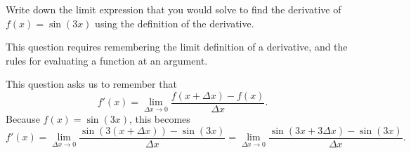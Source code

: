 \documentclass{ximera}
\author{Emma Smith Zbarsky}
\begin{document}
\begin{exercise}

Write down the limit expression that you would solve to find the
derivative of $f(x) = \sin(3x)$ using the definition of the derivative.


\begin{hint}
This question requires remembering the limit definition of a derivative,
and the rules for evaluating a function at an argument.
\end{hint}


\begin{hint}
This question asks us to remember that
\[f'(x) = \lim_{\Delta x \to 0} \frac{f(x+\Delta x)-f(x)}{\Delta x}.\]
Because $f(x) = \sin(3x)$, this becomes
\[f'(x) = \lim_{\Delta x \to 0} \frac{\sin(3(x+\Delta x))-\sin(3x)}{\Delta x} = \lim_{\Delta x \to 0} \frac{\sin(3x+3\Delta x)-\sin(3x)}{\Delta x}.\]
\end{hint}


\begin{multipleChoice}
\end{multipleChoice}

\end{exercise}
\end{document}
